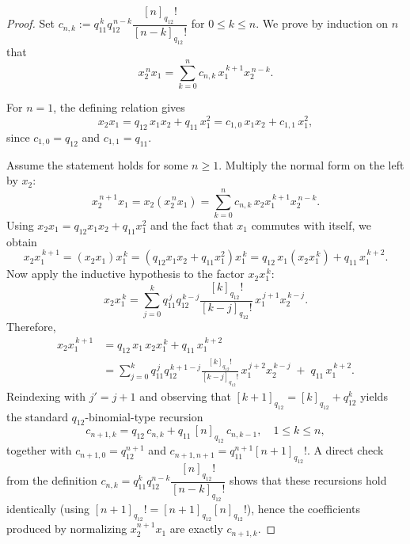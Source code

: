 \documentclass[10pt,a4paper]{amsart}
\begin{document}
\begin{proof}
Set $c_{n,k}:=q_{11}^{\,k}q_{12}^{\,n-k}\dfrac{[n]_{q_{12}}!}{[n-k]_{q_{12}}!}$ for $0\le k\le n$.
We prove by induction on $n$ that
\[
x_2^{\,n}x_1=\sum_{k=0}^{n} c_{n,k}\,x_1^{\,k+1}x_2^{\,n-k}.
\]

For $n=1$, the defining relation gives
\[
x_2x_1 = q_{12}\,x_1x_2 + q_{11}\,x_1^2
= c_{1,0}\,x_1x_2 + c_{1,1}\,x_1^2,
\]
since $c_{1,0}=q_{12}$ and $c_{1,1}=q_{11}$.

Assume the statement holds for some $n\ge1$. Multiply the normal form on the left by $x_2$:
\[
x_2^{\,n+1}x_1
= x_2(x_2^{\,n}x_1)
= \sum_{k=0}^{n} c_{n,k}\,x_2x_1^{\,k+1}x_2^{\,n-k}.
\]
Using $x_2x_1 = q_{12}x_1x_2 + q_{11}x_1^2$ and the fact that $x_1$ commutes with itself, we obtain
\[
x_2x_1^{\,k+1}
= (x_2x_1)x_1^{\,k}
= (q_{12}x_1x_2+q_{11}x_1^2)x_1^{\,k}
= q_{12}\,x_1(x_2x_1^{\,k}) + q_{11}\,x_1^{\,k+2}.
\]
Now apply the inductive hypothesis to the factor $x_2x_1^{\,k}$:
\[
x_2x_1^{\,k}
=
\sum_{j=0}^{k} q_{11}^{\,j}q_{12}^{\,k-j}\frac{[k]_{q_{12}}!}{[k-j]_{q_{12}}!}\,x_1^{\,j+1}x_2^{\,k-j}.
\]
Therefore,
\begin{align*}
x_2x_1^{\,k+1}
&=
q_{12}\,x_1\,x_2x_1^{\,k} + q_{11}\,x_1^{\,k+2}\\
&=
\sum_{j=0}^{k} q_{11}^{\,j}q_{12}^{\,k+1-j}\frac{[k]_{q_{12}}!}{[k-j]_{q_{12}}!}\,x_1^{\,j+2}x_2^{\,k-j}
\;+\; q_{11}\,x_1^{\,k+2}.
\end{align*}
Reindexing with $j'=j+1$ and observing that $[k+1]_{q_{12}}=[k]_{q_{12}}+q_{12}^{k}$ yields the standard $q_{12}$-binomial-type recursion
\[
c_{n+1,k}=q_{12}\,c_{n,k}+q_{11}\,[n]_{q_{12}}\,c_{n,k-1}, \quad 1\le k\le n,
\]
together with $c_{n+1,0}=q_{12}^{n+1}$ and $c_{n+1,n+1}=q_{11}^{n+1}[n+1]_{q_{12}}!$.
A direct check from the definition $c_{n,k}=q_{11}^{k}q_{12}^{n-k}\dfrac{[n]_{q_{12}}!}{[n-k]_{q_{12}}!}$
shows that these recursions hold identically (using $[n+1]_{q_{12}}!=[n+1]_{q_{12}}[n]_{q_{12}}!$),
hence the coefficients produced by normalizing $x_2^{n+1}x_1$ are exactly $c_{n+1,k}$.
\end{proof}
\end{document}

